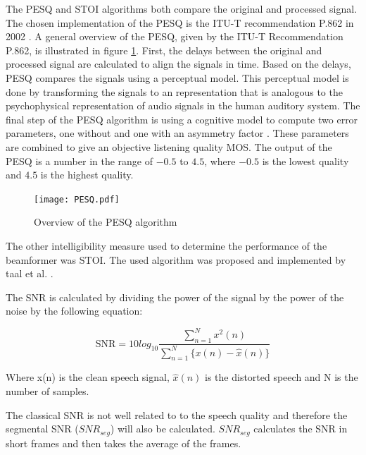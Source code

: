 The PESQ and STOI algorithms both compare the original and processed signal. The chosen implementation of the PESQ is the ITU-T recommendation P.862 in 2002 \cite{itu2010}. A general overview of the PESQ, given by the ITU-T Recommendation P.862, is illustrated in figure \ref{fig:PESQ_overview}. First, the delays between the original and processed signal are calculated to align the signals in time. Based on the delays, PESQ compares the signals using a perceptual model. This perceptual model is done by transforming the signals to an representation that is analogous to the psychophysical representation of audio signals in the human auditory system. The final step of the PESQ algorithm is using a cognitive model to compute two error parameters, one without and one with an asymmetry factor \cite{rix2001}.  These parameters are combined to give an objective listening quality MOS. The output of the PESQ is a number in the range of $-0.5$ to $4.5$, where $-0.5$ is the lowest quality and $4.5$ is the highest quality.

\begin{figure}
    \centering
       \texttt{[image: PESQ.pdf]} %
    \caption[General overview of the PESQ algorithm \cite{itu2010}]{Overview of the PESQ algorithm \cite{itu2010}}
    \label{fig:PESQ_overview}
\end{figure}

The other intelligibility measure used to determine the performance of the beamformer was STOI. The used algorithm was proposed and implemented by taal et al. \cite{taal2010,taal2011}.

The SNR is calculated by dividing the power of the signal by the power of the noise by the following equation:\cite{kondo2012}

\begin{equation}
\text{SNR} = 10log_{10} \frac{\sum_{n=1}^{N} x^2(n)}{\sum_{n=1}^{N} \{x(n) - \hat{x}(n)\}}
\end{equation}

Where x(n) is the clean speech signal, $\hat{x}(n)$ is the distorted speech and N is the number of samples.


The classical SNR is not well related to to the speech quality and therefore the segmental SNR ($SNR_{seg}$) will also be calculated. $SNR_{seg}$ calculates the SNR in short frames and then takes the average of the frames. 

